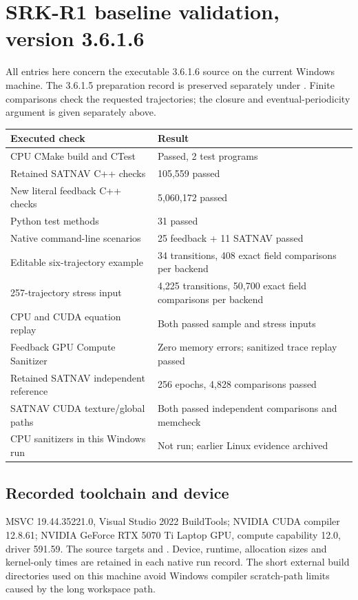 \section{SRK-R1 baseline validation, version 3.6.1.6}
All entries here concern the executable 3.6.1.6 source on the current Windows
machine. The 3.6.1.5 preparation record is preserved separately under
. Finite comparisons check the requested trajectories;
the closure and eventual-periodicity argument is given separately above.

\begin{center}
\begin{tabularx}{\textwidth}{@{}P{.53\textwidth}Y@{}}\toprule
\textbf{Executed check} & \textbf{Result}\\\midrule
CPU CMake build and CTest & Passed, 2 test programs\\
Retained SATNAV C++ checks & 105,559 passed\\
New literal feedback C++ checks & 5,060,172 passed\\
Python test methods & 31 passed\\
Native command-line scenarios & 25 feedback + 11 SATNAV passed\\
Editable six-trajectory example & 34 transitions, 408 exact field comparisons per backend\\
257-trajectory stress input & 4,225 transitions, 50,700 exact field comparisons per backend\\
CPU and CUDA equation replay & Both passed sample and stress inputs\\
Feedback GPU Compute Sanitizer & Zero memory errors; sanitized trace replay passed\\
Retained SATNAV independent reference & 256 epochs, 4,828 comparisons passed\\
SATNAV CUDA texture/global paths & Both passed independent comparisons and memcheck\\
CPU sanitizers in this Windows run & Not run; earlier Linux evidence archived\\\bottomrule
\end{tabularx}
\end{center}

\subsection{Recorded toolchain and device}
MSVC 19.44.35221.0, Visual Studio 2022 BuildTools; NVIDIA CUDA compiler 12.8.61;
NVIDIA GeForce RTX 5070 Ti Laptop GPU, compute capability 12.0, driver 591.59.
The source targets  and . Device, runtime,
allocation sizes and kernel-only times are retained in each native run record.
The short external build directories used on this machine avoid Windows compiler
scratch-path limits caused by the long workspace path.

